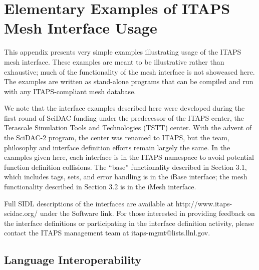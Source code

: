 \appendix
\section[Usage Examples]{Elementary Examples of ITAPS Mesh Interface
  Usage}\label{sec:usage-examples}

This appendix presents very simple examples illustrating usage of the
ITAPS mesh interface.  These examples are meant to be illustrative
rather than exhaustive; much of the functionality of the mesh interface
is not showcased here.  The examples are written as stand-alone programs
that can be compiled and run with any ITAPS-compliant mesh database.

We note that the interface examples described here were developed
during the first round of SciDAC funding under the predecessor of the
ITAPS center, the Terascale Simulation Tools and Technologies (TSTT)
center.  With the advent of the SciDAC-2 program, the center was
renamed to ITAPS, but the team, philosophy and interface definition
efforts remain largely the same.  In the examples given here,
each interface is in the ITAPS namespace to avoid potential function
definition collisions.  The ``base'' functionality described in
Section 3.1, which includes tags, sets, and error handling is in the
iBase interface; the mesh functionality described in Section 3.2 is in
the iMesh interface.  

Full SIDL descriptions of the interfaces are available at
http://www.itaps-scidac.org/ under the Software link.  For those interested
in providing feedback on the interface definitions or participating in the
interface definition activity, please contact the ITAPS management team
at itaps-mgmt@lists.llnl.gov.

\subsection{Language Interoperability}

